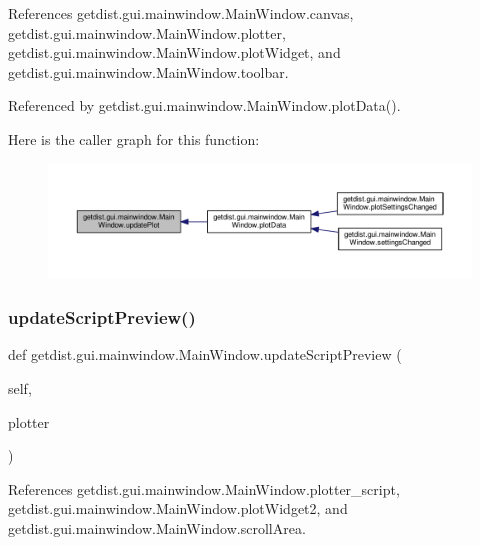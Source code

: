 References getdist.\+gui.\+mainwindow.\+Main\+Window.\+canvas, getdist.\+gui.\+mainwindow.\+Main\+Window.\+plotter, getdist.\+gui.\+mainwindow.\+Main\+Window.\+plot\+Widget, and getdist.\+gui.\+mainwindow.\+Main\+Window.\+toolbar.



Referenced by getdist.\+gui.\+mainwindow.\+Main\+Window.\+plot\+Data().

Here is the caller graph for this function\+:
\nopagebreak
\begin{figure}[H]
\begin{center}
\leavevmode
\includegraphics[width=350pt]{classgetdist_1_1gui_1_1mainwindow_1_1MainWindow_ae40013ba1fe1b4e96660b96f63fe1c8a_icgraph}
\end{center}
\end{figure}
\mbox{\label{classgetdist_1_1gui_1_1mainwindow_1_1MainWindow_a477f7c9959bc8d12d59af3d102767847}} 
\subsubsection{\texorpdfstring{update\+Script\+Preview()}{updateScriptPreview()}}
{\footnotesize\ttfamily def getdist.\+gui.\+mainwindow.\+Main\+Window.\+update\+Script\+Preview (\begin{DoxyParamCaption}\item[{}]{self,  }\item[{}]{plotter }\end{DoxyParamCaption})}



References getdist.\+gui.\+mainwindow.\+Main\+Window.\+plotter\+\_\+script, getdist.\+gui.\+mainwindow.\+Main\+Window.\+plot\+Widget2, and getdist.\+gui.\+mainwindow.\+Main\+Window.\+scroll\+Area.



